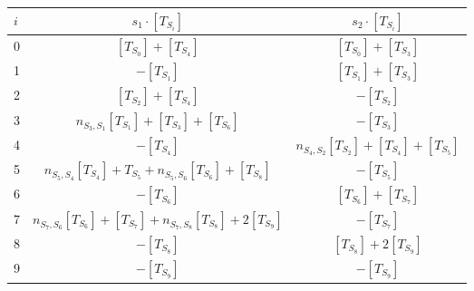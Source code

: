 \documentclass[a4paper, 11pt]{article}
\begin{document}
\begin{minipage}{\linewidth}
\medskip
\centering
{}\label{eq:ccactionOnConormal}
\begin{tabular}{ | l | c | c | }
\hline 
 $i$ & $s_{1}\cdot [T_{S_i}]$ & $s_{2}\cdot [T_{S_i}]$ \\ \hline \hline		
   0 & $[T_{S_0}]+[T_{S_4}]$ & $[T_{S_0}]+[T_{S_3}]$\\	\hline
   1 & $-[T_{S_1}]$ & $[T_{S_1}]+[T_{S_3}]$ \\ \hline
   2 & $[T_{S_2}]+[T_{S_4}]$ & $-[T_{S_2}]$ \\ \hline
   3 & $n_{S_3,S_1}^{}[T_{S_1}]+[T_{S_3}]+[T_{S_6}]$ & $-[T_{S_3}]$  \\ \hline
   4 & $-[T_{S_4}]$ & $n_{S_4,S_2}^{}[T_{S_2}]+[T_{S_4}]+[T_{S_5}]$\\ \hline
   5 & $n_{S_5,S_4}^{}[T_{S_4}]+T_{S_5}+n_{S_5,S_6}^{}[T_{S_6}]+[T_{S_8}]$ & $-[T_{S_5}]$\\ \hline 
   6 & $-[T_{S_6}]$ & $[T_{S_6}]+[T_{S_7}]$\\ \hline
   7 & $n_{S_7,S_6}^{}[T_{S_6}]+[T_{S_7}]+n_{S_7,S_8}^{}[T_{S_8}]+2[T_{S_9}]$ & $-[T_{S_7}]$\\ \hline 
   8 & $-[T_{S_8}]$ & $[T_{S_8}]+2[T_{S_9}]$\\ \hline
   9 & $-[T_{S_9}]$ & $-[T_{S_9}]$\\ 
  \hline  
\end{tabular}
\bigskip 
  \end{minipage}
\end{document}
